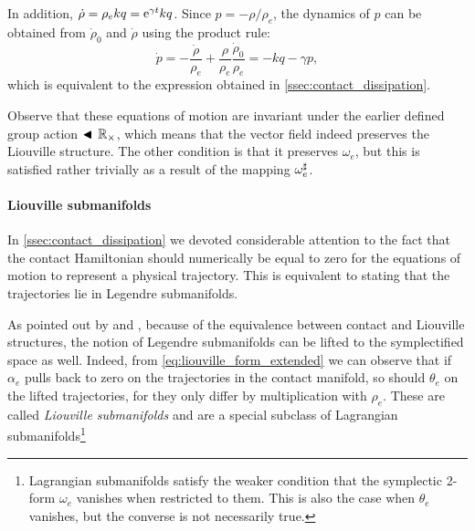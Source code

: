 In addition, \(\dot{\rho} = \rho_e kq = \mathrm{e}^{\gamma t} kq\). Since \(p = -\rho/\rho_e\), the dynamics of \(p\) can be obtained from  \(\dot{\rho}_0\) and \(\dot{\rho}\) using the product rule:
\begin{equation} 
    \dot{p} = -\frac{\dot{\rho}}{\rho_e} + \frac{\rho}{\rho_e}\frac{\dot{\rho}_0}{\rho_e} = -kq - \gamma p,
    \label{eq:pdot}
\end{equation}
which is equivalent to the expression obtained in \cref{ssec:contact_dissipation}.

Observe that these equations of motion are invariant under the earlier defined group action \(\blacktriangleleft\,\mathbb{R}_{\times}\), which means that the vector field indeed preserves the Liouville structure. The other condition is that it preserves \(\omega_e\), but this is satisfied rather trivially as a result of the mapping \(\omega_e^\sharp\).

\paragraph{Liouville submanifolds} In \cref{ssec:contact_dissipation} we devoted considerable attention to the fact that the contact Hamiltonian should numerically be equal to zero for the equations of motion to represent a physical trajectory. This is equivalent to stating that the trajectories lie in Legendre submanifolds.

As pointed out by \citet{VanderSchaft2021a} and \citet{Libermann1987}, because of the equivalence between contact and Liouville structures, the notion of Legendre submanifolds can be lifted to the symplectified space as well. Indeed, from \cref{eq:liouville_form_extended} we can observe that if \(\alpha_e\) pulls back to zero on the trajectories in the contact manifold, so should \(\theta_e\) on the lifted trajectories, for they only differ by multiplication with \(\rho_e\). These are called \emph{Liouville submanifolds} and are a special subclass of Lagrangian submanifolds\footnote{Lagrangian submanifolds satisfy the weaker condition that the symplectic 2-form \(\omega_e\) vanishes when restricted to them. This is also the case when \(\theta_e\) vanishes, but the converse is not necessarily true.}

